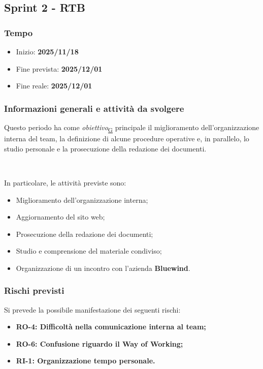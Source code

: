 \documentclass[a4paper,12pt]{article}
\begin{document}
    \subsection{Sprint 2 - RTB}{
        \subsubsection{Tempo}{
            \begin{itemize}
                \item[] Inizio: \textbf{2025/11/18} 
                \item[] Fine prevista: \textbf{2025/12/01} 
                \item[] Fine reale: \textbf{2025/12/01} 
            \end{itemize}
        }

        \subsubsection{Informazioni generali e attività da svolgere}{
            Questo periodo ha come \textit{obiettivo}\textsubscript{\href{https://atlasteam9.github.io/Atlas/glossario.html\#Obiettivo}{G}} principale il miglioramento dell'organizzazione interna del team, la definizione di alcune procedure operative e, in parallelo, lo studio personale e la prosecuzione della redazione dei documenti.
            
            \ 

            \noindent In particolare, le attività previste sono:
            \begin{itemize}
                \item Miglioramento dell'organizzazione interna;
                \item Aggiornamento del sito web;
                \item Prosecuzione della redazione dei documenti;
                \item Studio e comprensione del materiale condiviso;
                \item Organizzazione di un incontro con l'azienda \textbf{Bluewind}.
            \end{itemize}
        }

        \subsubsection{Rischi previsti}{
            Si prevede la possibile manifestazione dei seguenti rischi:
            \begin{itemize}
                \item \textbf{RO-4: Difficoltà nella comunicazione interna al team;}
                \item \textbf{RO-6: Confusione riguardo il Way of Working;}
                \item \textbf{RI-1: Organizzazione tempo personale.}
            \end{itemize}
        }
}
\end{document}
